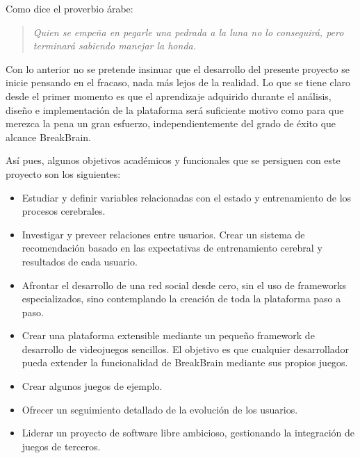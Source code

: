 Como dice el proverbio árabe:

\begin{quote}
{\it Quien se empeña en pegarle una pedrada a la luna no lo conseguirá, pero terminará sabiendo manejar la honda.}
\end{quote}

Con lo anterior no se pretende insinuar que el desarrollo del presente proyecto se inicie pensando en el fracaso, nada más lejos de la realidad. Lo que se tiene claro desde el primer momento es que el aprendizaje adquirido durante el análisis, diseño e implementación de la plataforma será suficiente motivo como para que merezca la pena un gran esfuerzo, independientemente del grado de éxito que alcance BreakBrain.

Así pues, algunos objetivos académicos y funcionales que se persiguen con este proyecto son los siguientes:

\begin{itemize}
\item Estudiar y definir variables relacionadas con el estado y entrenamiento de los procesos cerebrales.
\item Investigar y preveer relaciones entre usuarios. Crear un sistema de recomendación basado en las expectativas de entrenamiento cerebral y resultados de cada usuario.
\item Afrontar el desarrollo de una red social desde cero, sin el uso de frameworks especializados, sino contemplando la creación de toda la plataforma paso a paso.
\item Crear una plataforma extensible mediante un pequeño framework de desarrollo de videojuegos sencillos. El objetivo es que cualquier desarrollador pueda extender la funcionalidad de BreakBrain mediante sus propios juegos.
\item Crear algunos juegos de ejemplo.
\item Ofrecer un seguimiento detallado de la evolución de los usuarios.
\item Liderar un proyecto de software libre ambicioso, gestionando la integración de juegos de terceros.
\end{itemize}



